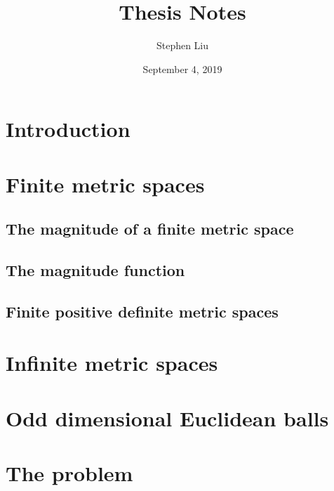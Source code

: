 \documentclass[11pt]{article}
\theoremstyle{definition}
\theoremstyle{definition}
\theoremstyle{plain}
\theoremstyle{plain}
\theoremstyle{plain}
\theoremstyle{definition}
\begin{document}
\author{Stephen Liu}
\title{Thesis Notes}
\date{September 4, 2019}

\maketitle

\begin{abstract}
\end{abstract}

\tableofcontents
\newpage

\section{Introduction}

\section{Finite metric spaces}

\subsection{The magnitude of a finite metric space}

\subsection{The magnitude function}

\subsection{Finite positive definite metric spaces}

\section{Infinite metric spaces}

\section{Odd dimensional Euclidean balls}

\section{The problem}
\end{document}
